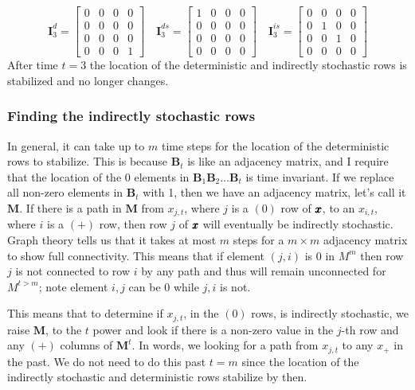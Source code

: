 \documentclass[]{article}
\def\UPS{\mbox{\boldmath $\Upsilon$}}
\def\BB{\mbox{$\mathbf B$}}	\def\bb{\mbox{$\mathbf b$}} \def\Bb{\mbox{$\mathbf J$}} \def\Ba{\mbox{$\mathbf L$}} \def\Bm{\UPS}
\def\II{\mbox{$\mathbf I$}} \def\ii{\mbox{$\mathbf i$}}
\def\MM{\mbox{$\mathbf M$}}  \def\mm{\mbox{$\mathbf m$}}
\begin{document}
\begin{equation}
\II_3^d=\begin{bmatrix}
0&0&0&0\\
0&0&0&0\\
0&0&0&0\\
0&0&0&1
\end{bmatrix}
\quad
\II_3^{ds}=\begin{bmatrix}
1&0&0&0\\
0&0&0&0\\
0&0&0&0\\
0&0&0&0
\end{bmatrix}
\quad
\II_3^{is}=\begin{bmatrix}
0&0&0&0\\
0&1&0&0\\
0&0&1&0\\
0&0&0&0
\end{bmatrix}
\end{equation}
After time $t=3$ the location of the deterministic and indirectly stochastic rows is stabilized and no longer changes.  

\subsubsection*{Finding the indirectly stochastic rows}

In general, it can take up to $m$ time steps for the location of the deterministic rows to stabilize.  This is because $\BB_t$ is like an adjacency matrix, and I require that the location of the 0 elements in $\BB_1\BB_2\dots\BB_t$ is time invariant. If we replace all non-zero elements in $\BB_t$ with 1, then we have an adjacency matrix, let's call it $\MM$.  If there is a path in $\MM$ from $x_{j,t}$, where $j$ is a $(0)$ row of $\mbox{$\pmb{x}$}$, to an $x_{i,t}$, where $i$ is a $(+)$ row, then row $j$ of $\mbox{$\pmb{x}$}$ will eventually be indirectly stochastic. Graph theory tells us that it takes at most $m$ steps for a $m \times m$ adjacency matrix to show full connectivity. This means that if element $(j,i)$ is 0 in $M^m$ then row $j$ is not connected to row $i$ by any path and thus will remain unconnected for $M^{t>m}$; note element $i,j$ can be 0 while $j,i$ is not.

This means that to determine if $x_{j,t}$, in the $(0)$ rows, is indirectly stochastic, we raise $\MM$, to the $t$ power and look if there is a non-zero value in the $j$-th row and any $(+)$ columns of $\MM^t$.  In words, we looking for a path from $x_{j,t}$ to any $x_{+}$ in the past. We do not need to do this past $t=m$ since the location of the indirectly stochastic and deterministic rows stabilize by then.
\end{document}
